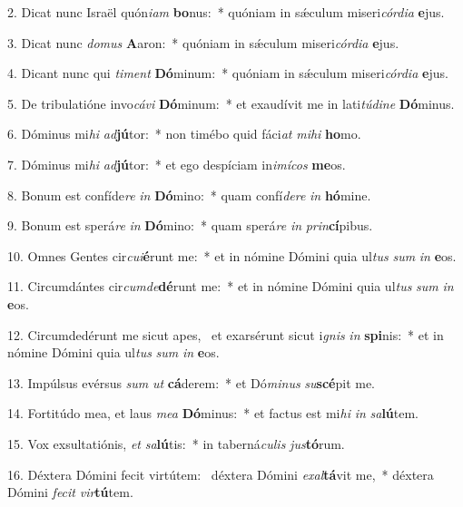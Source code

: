 2. Dicat nunc Israël quón\textit{i}\textit{am} \textbf{bo}nus:~*  quóniam in sǽculum miseri\textit{cór}\textit{di}\textit{a} \textbf{e}jus.\

3. Dicat nunc \textit{do}\textit{mus} \textbf{A}aron:~*  quóniam in sǽculum miseri\textit{cór}\textit{di}\textit{a} \textbf{e}jus.\

4. Dicant nunc qui \textit{ti}\textit{ment} \textbf{Dó}minum:~*  quóniam in sǽculum miseri\textit{cór}\textit{di}\textit{a} \textbf{e}jus.\

5. De tribulatióne invo\textit{cá}\textit{vi} \textbf{Dó}minum:~*  et exaudívit me in lati\textit{tú}\textit{di}\textit{ne} \textbf{Dó}minus.\

6. Dóminus mi\textit{hi} \textit{ad}\textbf{jú}tor:~*  non timébo quid fáci\textit{at} \textit{mi}\textit{hi} \textbf{ho}mo.\

7. Dóminus mi\textit{hi} \textit{ad}\textbf{jú}tor:~*  et ego despíciam in\textit{i}\textit{mí}\textit{cos} \textbf{me}os.\

8. Bonum est confíde\textit{re} \textit{in} \textbf{Dó}mino:~*  quam confí\textit{de}\textit{re} \textit{in} \textbf{hó}mine.\

9. Bonum est sperá\textit{re} \textit{in} \textbf{Dó}mino:~*  quam sperá\textit{re} \textit{in} \textit{prin}\textbf{cí}pibus.\

10. Omnes Gentes cir\textit{cu}\textit{i}\textbf{é}runt me:~*  et in nómine Dómini quia ul\textit{tus} \textit{sum} \textit{in} \textbf{e}os.\

11. Circumdántes cir\textit{cum}\textit{de}\textbf{dé}runt me:~*  et in nómine Dómini quia ul\textit{tus} \textit{sum} \textit{in} \textbf{e}os.\

12. Circumdedérunt me sicut apes, \dag\  et exarsérunt sicut i\textit{gnis} \textit{in} \textbf{spi}nis:~*  et in nómine Dómini quia ul\textit{tus} \textit{sum} \textit{in} \textbf{e}os.\

13. Impúlsus evérsus \textit{sum} \textit{ut} \textbf{cá}derem:~*  et Dó\textit{mi}\textit{nus} \textit{su}\textbf{scé}pit me.\

14. Fortitúdo mea, et laus \textit{me}\textit{a} \textbf{Dó}minus:~*  et factus est mi\textit{hi} \textit{in} \textit{sa}\textbf{lú}tem.\

15. Vox exsultatiónis, \textit{et} \textit{sa}\textbf{lú}tis:~*  in taberná\textit{cu}\textit{lis} \textit{jus}\textbf{tó}rum.\

16. Déxtera Dómini fecit virtútem: \dag\  déxtera Dómini \textit{ex}\textit{al}\textbf{tá}vit me,~*  déxtera Dómini \textit{fe}\textit{cit} \textit{vir}\textbf{tú}tem.\

